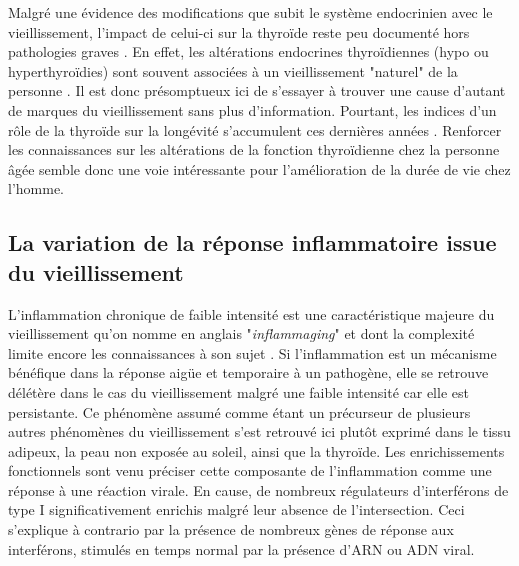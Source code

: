 Malgré une évidence des modifications que subit le système endocrinien avec le vieillissement, l'impact de celui-ci sur la thyroïde reste peu documenté hors pathologies graves . En effet, les altérations endocrines thyroïdiennes (hypo ou hyperthyroïdies) sont souvent associées à un vieillissement "naturel" de la personne . Il est donc présomptueux ici de s'essayer à trouver une cause d'autant de marques du vieillissement sans plus d'information. Pourtant, les indices d'un rôle de la thyroïde sur la longévité s'accumulent ces dernières années . Renforcer les connaissances sur les altérations de la fonction thyroïdienne chez la personne âgée semble donc une voie intéressante pour l'amélioration de la durée de vie chez l'homme.


\subsection{La variation de la réponse inflammatoire issue du vieillissement}

L'inflammation chronique de faible intensité est une caractéristique majeure du vieillissement qu'on nomme en anglais "\textit{inflammaging}"  et dont la complexité limite encore les connaissances à son sujet . Si l'inflammation est un mécanisme bénéfique dans la réponse aigüe et temporaire à un pathogène, elle se retrouve délétère dans le cas du vieillissement malgré une faible intensité car elle est persistante. Ce phénomène assumé comme étant un précurseur de plusieurs autres phénomènes du vieillissement  s'est retrouvé ici plutôt exprimé dans le tissu adipeux, la peau non exposée au soleil, ainsi que la thyroïde. Les enrichissements fonctionnels sont venu préciser cette composante de l'inflammation comme une réponse à une réaction virale. En cause, de nombreux régulateurs d'interférons de type I significativement enrichis malgré leur absence de l'intersection. Ceci s'explique à contrario par la présence de nombreux gènes de réponse aux interférons, stimulés en temps normal par la présence d'ARN ou ADN viral.

